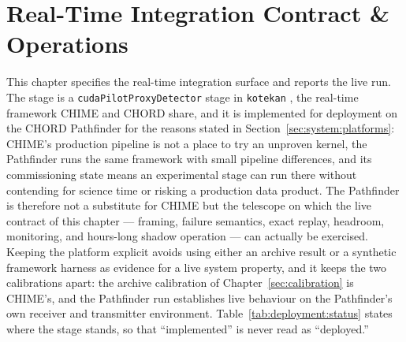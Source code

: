 \chapter{Real-Time Integration Contract \& Operations}
\label{sec:deployment}

This chapter specifies the real-time integration surface and reports the
live run.  The stage is a \texttt{cudaPilotProxyDetector} stage in
\texttt{kotekan} \cite{kotekan}, the real-time framework CHIME and CHORD share,
and it is implemented for deployment on the CHORD Pathfinder for the reasons stated in
Section~\ref{sec:system:platforms}: CHIME's production pipeline is not a place
to try an unproven kernel, the Pathfinder runs the same framework with small
pipeline differences, and its commissioning state means an experimental stage
can run there without contending for science time or risking a production data
product.  The Pathfinder is therefore not a substitute for CHIME but the
telescope on which the live contract of this chapter --- framing, failure
semantics, exact replay, headroom, monitoring, and hours-long shadow operation
--- can actually be exercised.  Keeping the platform explicit avoids using
either an archive result or a synthetic framework harness as evidence for a
live system property, and it keeps the two calibrations apart: the archive
calibration of Chapter~\ref{sec:calibration} is CHIME's, and the Pathfinder
run establishes live behaviour on the Pathfinder's own receiver and
transmitter environment.  Table~\ref{tab:deployment:status} states where the stage stands, so that
``implemented'' is never read as ``deployed.''

